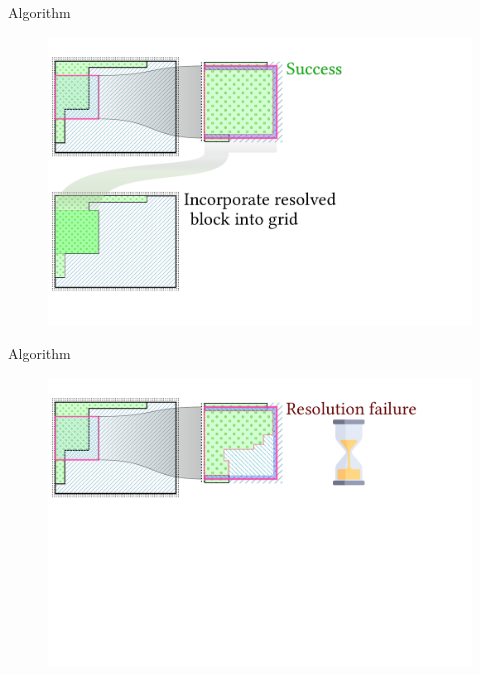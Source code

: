 \documentclass{beamer}
\begin{document}
  \begin{frame}[fragile]{Algorithm}
    \begin{figure}
      \includegraphics[width=\textwidth]{figs/poms_alg4_5.pdf}
    \end{figure}
  \end{frame}

  \begin{frame}[fragile]{Algorithm}
    \begin{figure}
      \includegraphics[width=\textwidth]{figs/poms_alg5.pdf}
    \end{figure}
  \end{frame}
\end{document}
